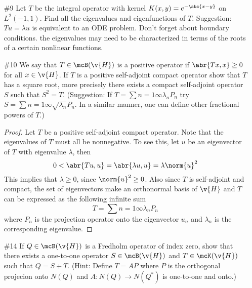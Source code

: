 \documentclass[11pt, oneside]{article}
\begin{document}
\begin{enumerate}
\begin{proof}
      This shows that $\lambda$ and $u(x)$ are an eigenvalue and eigenfunction
      pair for $T$.
      Thus $\lambda \in \sigma_p(T)$ and $(0, 2) \subset \sigma_p(T)$
    \end{proof}

  \item[\#9]
    Let $T$ be the integral operator with kernel $K(x, y) = e^{-\abs{x - y}}$
    on $L^2(-1, 1)$.
    Find all the eigenvalues and eigenfunctions of $T$.
    Suggestion: $Tu = \lambda u$ is equivalent to an ODE problem.
    Don't forget about boundary conditions.
    the eigenvalues may need to be characterized in terms of the roots of a
    certain nonlinear functions.

  \item[\#10]
    We say that $T \in \mcB(\v{H})$ is a positive operator if
    $\abr{Tx, x} \ge 0$ for all $x \in \v{H}$.
    If $T$ is a positive self-adjoint compact operator show that $T$ has a
    square root, more precisely there exists a compact self-adjoint operator $S$
    such that $S^2 = T$.
    (Suggestion: If $T = \sum{n = 1}{\infty}{\lambda_n P_n}$ try
    $S = \sum{n = 1}{\infty}{\sqrt{\lambda_n} P_n}$.
    In a similar manner, one can define other fractional powers of $T$.)

    \begin{proof}
      Let $T$ be a positive self-adjoint compact operator.
      Note that the eigenvalues of $T$ must all be nonnegative.
      To see this, let $u$ be an eigenvector of $T$ with eigenvalue $\lambda$,
      then
      \[
        0 < \abr{Tu, u} = \abr{\lambda u, u} = \lambda \norm{u}^2
      \]
      This implies that $\lambda \ge 0$, since $\norm{u}^2 \ge 0$.
      Also since $T$ is self-adjoint and compact, the set of eigenvectors make
      an orthonormal basis of $\v{H}$ and $T$ can be expressed as the following
      infinite sum
      \[
        T = \sum{n = 1}{\infty}{\lambda_n P_n}
      \]
      where $P_n$ is the projection operator onto the eigenvector $u_n$ and
      $\lambda_n$ is the corresponding eigenvalue.

    \end{proof}

  \item[\#14] %
    If $Q \in \mcB(\v{H})$ is a Fredholm operator of index zero, show that there
    exists a one-to-one operator $S \in \mcB(\v{H})$ and $T \in \mcK(\v{H})$
    such that $Q = S + T$.
    (Hint: Define $T = AP$ where $P$ is the orthogonal projecion onto $N(Q)$ and
    $A: N(Q) \to N(Q^*)$ is one-to-one and onto.)


\end{enumerate}
\end{document}
